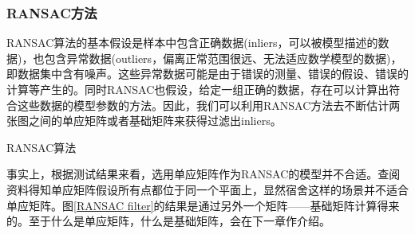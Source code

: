 \subsubsection{RANSAC方法}
RANSAC算法的基本假设是样本中包含正确数据(inliers，可以被模型描述的数据)，也包含异常数据(outliers，偏离正常范围很远、无法适应数学模型的数据)，即数据集中含有噪声。这些异常数据可能是由于错误的测量、错误的假设、错误的计算等产生的。同时RANSAC也假设，给定一组正确的数据，存在可以计算出符合这些数据的模型参数的方法。因此，我们可以利用RANSAC方法去不断估计两张图之间的单应矩阵或者基础矩阵来获得过滤出inliers。
\begin{algorithm}[htb]
	\SetAlgoLined

	\caption{RANSAC算法}
	\label{algo:RANSAC}
\end{algorithm}
\par
事实上，根据测试结果来看，选用单应矩阵作为RANSAC的模型并不合适。查阅资料得知单应矩阵假设所有点都位于同一个平面上，显然宿舍这样的场景并不适合单应矩阵。图\ref{RANSAC filter}的结果是通过另外一个矩阵——基础矩阵计算得来的。至于什么是单应矩阵，什么是基础矩阵，会在下一章作介绍。












